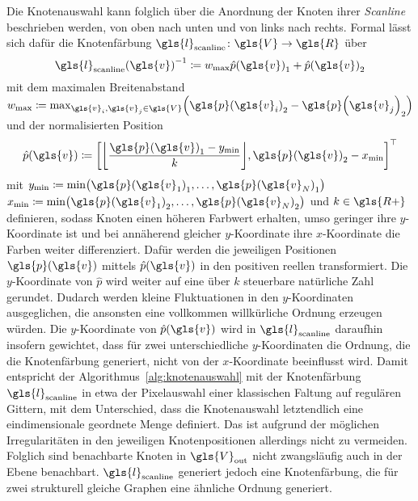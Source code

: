 Die Knotenauswahl kann folglich über die Anordnung der Knoten \bzgl{} ihrer \emph{Scanline} beschrieben werden, \dhe{} von oben nach unten und von links nach rechts.
Formal lässt sich dafür die Knotenfärbung $\gls{l}_{\mathrm{scanline}} \colon \gls{V} \to \gls{R}$ über
\begin{equation*}
  {\gls{l}_{\mathrm{scanline}}\left(\gls{v}\right)}^{-1} \coloneqq w_{\max} {\hat p\left(\gls{v}\right)}_1 + {\hat p\left(\gls{v}\right)}_2
\end{equation*}
mit dem maximalen Breitenabstand $w_{\max} \coloneqq \max_{\gls{v}_i, \gls{v}_j \in \gls{V}} \left({\gls{p}\left(\gls{v}_i\right)}_2 - {\gls{p}\left(\gls{v}_j\right)}_2 \right)$ und der normalisierten Position
\begin{equation*}
  \hat p\left(\gls{v}\right) \coloneqq {\left[\left\lfloor\frac{{\gls{p}\left(\gls{v}\right)}_1 - y_{\min}}{k} \right\rfloor, {\gls{p}\left(\gls{v}\right)}_2 - x_{\min}\right]}^{\top}
\end{equation*}
mit $y_{\min} \coloneqq \min \left({\gls{p}\left(\gls{v}_1\right)}_1, \ldots, {\gls{p}\left(\gls{v}_N\right)}_1\right)$ \bzw{} $x_{\min} \coloneqq \min \left({\gls{p}\left(\gls{v}_1\right)}_2, \ldots, {\gls{p}\left(\gls{v}_N\right)}_2\right)$ und $k \in \gls{R+}$ definieren, sodass Knoten einen höheren Farbwert erhalten, umso geringer ihre $y$-Koordinate ist und bei annäherend gleicher $y$-Koordinate ihre $x$-Koordinate die Farben weiter differenziert.
Dafür werden die jeweiligen Positionen $\gls{p}\left(\gls{v}\right)$ mittels $\hat p\left(\gls{v}\right)$ in den positiven reellen transformiert.
Die $y$-Koordinate von $\hat p$ wird weiter auf eine über $k$ steuerbare natürliche Zahl gerundet.
Dudarch werden kleine Fluktuationen in den $y$-Koordinaten ausgeglichen, die ansonsten eine vollkommen willkürliche Ordnung erzeugen würden.
Die $y$-Koordinate von $\hat p\left(\gls{v}\right)$ wird in $\gls{l}_{\mathrm{scanline}}$ daraufhin insofern gewichtet, dass für zwei unterschiedliche $y$-Koordinaten die Ordnung, die die Knotenfärbung generiert, nicht von der $x$-Koordinate beeinflusst wird.
Damit entspricht der Algorithmus~\ref{alg:knotenauswahl} mit der Knotenfärbung $\gls{l}_{\mathrm{scanline}}$ in etwa der Pixelauswahl einer klassischen Faltung auf regulären Gittern, mit dem Unterschied, dass die Knotenauswahl letztendlich eine eindimensionale geordnete Menge definiert.
Das ist aufgrund der möglichen Irregularitäten in den jeweiligen Knotenpositionen allerdings nicht zu vermeiden.
Folglich sind benachbarte Knoten in $\gls{V}_{\mathrm{out}}$ nicht zwangsläufig auch in der Ebene benachbart.
$\gls{l}_{\mathrm{scanline}}$ generiert jedoch eine Knotenfärbung, die für zwei strukturell gleiche Graphen eine ähnliche Ordnung generiert.



